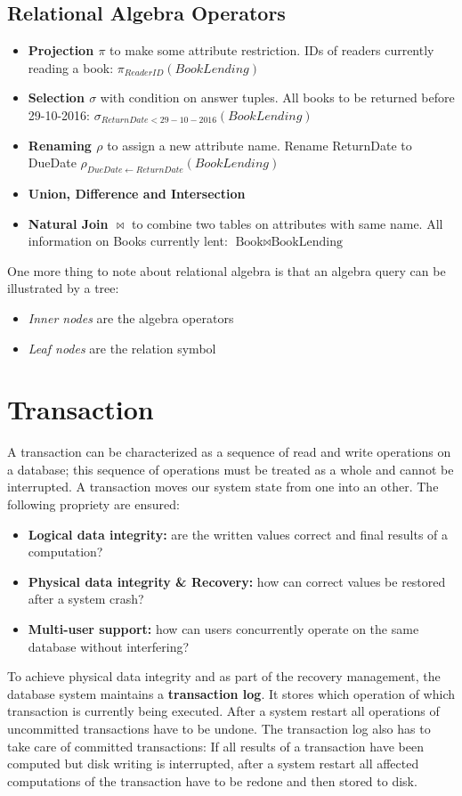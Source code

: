 \subsection{Relational Algebra Operators}
\begin{itemize}
    \item \textbf{Projection \(\pi\)} to make some attribute restriction. IDs of readers currently reading a book: \(\pi_{ReaderID}(BookLending)\)
    \item \textbf{Selection \(\sigma\)} with condition on answer tuples. All books to be returned before 29-10-2016: \(\sigma_{ReturnDate<29-10-2016}(BookLending)\)
    \item \textbf{Renaming \(\rho\)} to assign a new attribute name. Rename ReturnDate to DueDate \(\rho_{DueDate\leftarrow ReturnDate}(BookLending)\)
    \item \textbf{Union, Difference and Intersection}
    \item \textbf{Natural Join \(\Join\)} to combine two tables on attributes with same name. All information on Books currently lent: \(\text{Book} \Join \text{BookLending}\)
\end{itemize}
One more thing to note about relational algebra is that an algebra query can be illustrated by a tree:
\begin{itemize}
    \item \textit{Inner nodes} are the algebra operators
    \item \textit{Leaf nodes} are the relation symbol
\end{itemize}

\section{Transaction}
A transaction can be characterized as a sequence of read and write operations on a database; this sequence of operations must be treated as a whole and cannot be interrupted. A transaction moves our system state from one into an other. The following propriety are ensured:
\begin{itemize}
    \item \textbf{Logical data integrity:} are the written values correct and final results of a computation?
    \item \textbf{Physical data integrity \& Recovery:} how can correct values be restored after a system crash?
    \item \textbf{Multi-user support:} how can users concurrently operate on the same database without interfering?
\end{itemize}
To achieve physical data integrity and as part of the recovery management, the database system maintains a \textbf{transaction log}. It stores which operation of which transaction is currently being executed. After a system restart all operations of uncommitted transactions have to be undone. The transaction log also has to take care of committed transactions: If all results of a transaction have been computed but disk writing is interrupted, after a system restart all affected computations of the transaction have to be redone and then stored to disk.


